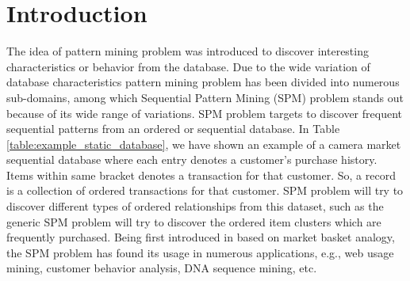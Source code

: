\section{Introduction}\label{sec:introduction}




%
%
%
%
The idea of pattern mining problem was introduced to discover interesting characteristics or behavior from the database. Due to the wide variation of database characteristics pattern mining problem has been divided into numerous sub-domains, among which Sequential Pattern Mining (SPM) problem stands out because of its wide range of variations. SPM problem targets to discover frequent sequential patterns from an ordered or sequential database. In Table \ref{table:example_static_database}, we have shown an example of a camera market sequential database where each entry denotes a customer's purchase history. Items within same bracket denotes a transaction for that customer. So, a record is a collection of ordered transactions for that customer. SPM problem will try to discover different types of ordered relationships from this dataset, such as the generic SPM problem will try to discover the ordered item clusters which are frequently purchased. Being first introduced in \cite{srikant1996mining} based on market basket analogy, the SPM problem has found its usage in numerous applications, e.g., web usage mining, customer behavior analysis, DNA sequence mining, etc.

